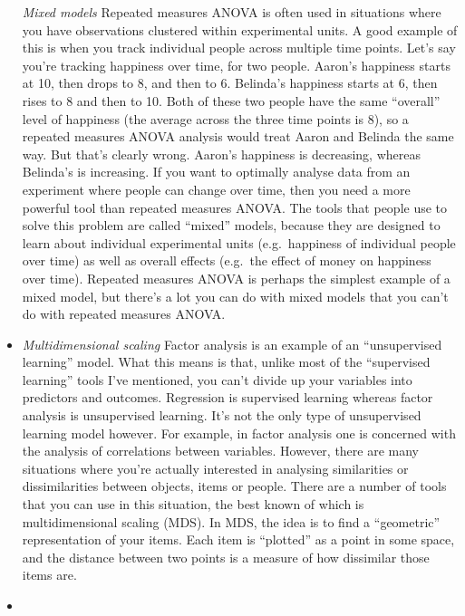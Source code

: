 \documentclass[
]{book}
\begin{document}
\begin{itemize}
  \emph{Mixed models} Repeated measures ANOVA is often used in situations where you have observations clustered within experimental units. A good example of this is when you track individual people across multiple time points. Let's say you're tracking happiness over time, for two people. Aaron's happiness starts at 10, then drops to 8, and then to 6. Belinda's happiness starts at 6, then rises to 8 and then to 10. Both of these two people have the same ``overall'' level of happiness (the average across the three time points is 8), so a repeated measures ANOVA analysis would treat Aaron and Belinda the same way. But that's clearly wrong. Aaron's happiness is decreasing, whereas Belinda's is increasing. If you want to optimally analyse data from an experiment where people can change over time, then you need a more powerful tool than repeated measures ANOVA. The tools that people use to solve this problem are called ``mixed'' models, because they are designed to learn about individual experimental units (e.g.~happiness of individual people over time) as well as overall effects (e.g.~the effect of money on happiness over time). Repeated measures ANOVA is perhaps the simplest example of a mixed model, but there's a lot you can do with mixed models that you can't do with repeated measures ANOVA.
\item
  \emph{Multidimensional scaling} Factor analysis is an example of an ``unsupervised learning'' model. What this means is that, unlike most of the ``supervised learning'' tools I've mentioned, you can't divide up your variables into predictors and outcomes. Regression is supervised learning whereas factor analysis is unsupervised learning. It's not the only type of unsupervised learning model however. For example, in factor analysis one is concerned with the analysis of correlations between variables. However, there are many situations where you're actually interested in analysing similarities or dissimilarities between objects, items or people. There are a number of tools that you can use in this situation, the best known of which is multidimensional scaling (MDS). In MDS, the idea is to find a ``geometric'' representation of your items. Each item is ``plotted'' as a point in some space, and the distance between two points is a measure of how dissimilar those items are.\\
\item

\end{itemize}
\end{document}
